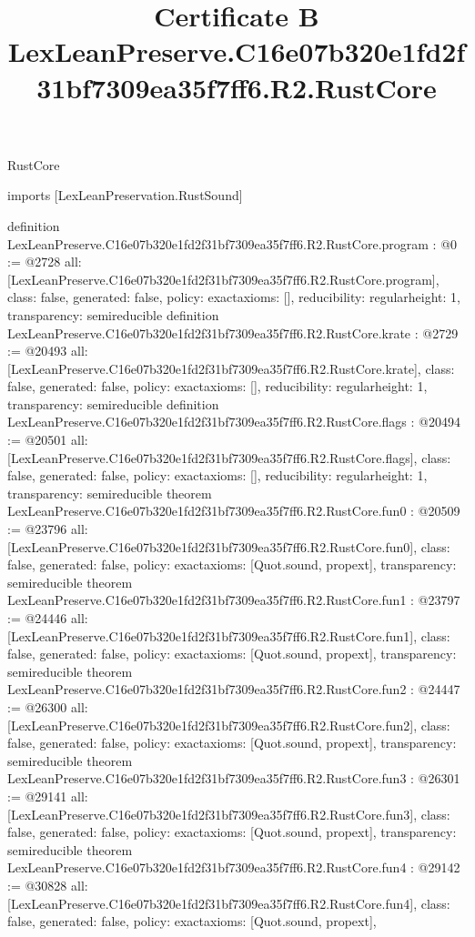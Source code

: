 \begin{lexlean}{RustCore}
\title{Certificate B LexLeanPreserve.C16e07b320e1fd2f31bf7309ea35f7ff6.R2.RustCore}
\begin{coremodule}
imports [LexLeanPreservation.RustSound]

definition LexLeanPreserve.C16e07b320e1fd2f31bf7309ea35f7ff6.R2.RustCore.program : @0 := @2728 {
  all: [LexLeanPreserve.C16e07b320e1fd2f31bf7309ea35f7ff6.R2.RustCore.program],
  class: false,
  generated: false,
  policy: exact{axioms: []},
  reducibility: regular{height: 1},
  transparency: semireducible
}
definition LexLeanPreserve.C16e07b320e1fd2f31bf7309ea35f7ff6.R2.RustCore.krate : @2729 := @20493 {
  all: [LexLeanPreserve.C16e07b320e1fd2f31bf7309ea35f7ff6.R2.RustCore.krate],
  class: false,
  generated: false,
  policy: exact{axioms: []},
  reducibility: regular{height: 1},
  transparency: semireducible
}
definition LexLeanPreserve.C16e07b320e1fd2f31bf7309ea35f7ff6.R2.RustCore.flags : @20494 := @20501 {
  all: [LexLeanPreserve.C16e07b320e1fd2f31bf7309ea35f7ff6.R2.RustCore.flags],
  class: false,
  generated: false,
  policy: exact{axioms: []},
  reducibility: regular{height: 1},
  transparency: semireducible
}
theorem LexLeanPreserve.C16e07b320e1fd2f31bf7309ea35f7ff6.R2.RustCore.fun0 : @20509 := @23796 {
  all: [LexLeanPreserve.C16e07b320e1fd2f31bf7309ea35f7ff6.R2.RustCore.fun0],
  class: false,
  generated: false,
  policy: exact{axioms: [Quot.sound, propext]},
  transparency: semireducible
}
theorem LexLeanPreserve.C16e07b320e1fd2f31bf7309ea35f7ff6.R2.RustCore.fun1 : @23797 := @24446 {
  all: [LexLeanPreserve.C16e07b320e1fd2f31bf7309ea35f7ff6.R2.RustCore.fun1],
  class: false,
  generated: false,
  policy: exact{axioms: [Quot.sound, propext]},
  transparency: semireducible
}
theorem LexLeanPreserve.C16e07b320e1fd2f31bf7309ea35f7ff6.R2.RustCore.fun2 : @24447 := @26300 {
  all: [LexLeanPreserve.C16e07b320e1fd2f31bf7309ea35f7ff6.R2.RustCore.fun2],
  class: false,
  generated: false,
  policy: exact{axioms: [Quot.sound, propext]},
  transparency: semireducible
}
theorem LexLeanPreserve.C16e07b320e1fd2f31bf7309ea35f7ff6.R2.RustCore.fun3 : @26301 := @29141 {
  all: [LexLeanPreserve.C16e07b320e1fd2f31bf7309ea35f7ff6.R2.RustCore.fun3],
  class: false,
  generated: false,
  policy: exact{axioms: [Quot.sound, propext]},
  transparency: semireducible
}
theorem LexLeanPreserve.C16e07b320e1fd2f31bf7309ea35f7ff6.R2.RustCore.fun4 : @29142 := @30828 {
  all: [LexLeanPreserve.C16e07b320e1fd2f31bf7309ea35f7ff6.R2.RustCore.fun4],
  class: false,
  generated: false,
  policy: exact{axioms: [Quot.sound, propext]},
}
\end{coremodule}
\end{lexlean}
